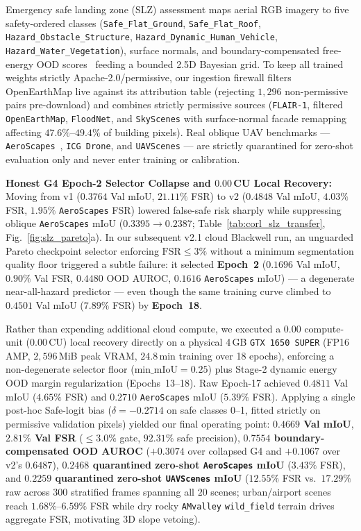 \documentclass[10pt]{article}
\begin{document}
Emergency safe landing zone (SLZ) assessment maps aerial RGB imagery to five safety-ordered classes (\texttt{Safe\_Flat\_Ground}, \texttt{Safe\_Flat\_Roof}, \texttt{Hazard\_Obstacle\_Structure}, \texttt{Hazard\_Dynamic\_Human\_Vehicle}, \texttt{Hazard\_Water\_Vegetation}), surface normals, and boundary-compensated free-energy OOD scores~\cite{liu_energy_ood_2020} feeding a bounded 2.5D Bayesian grid. To keep all trained weights strictly Apache-2.0/permissive, our ingestion firewall filters OpenEarthMap live against its attribution table (rejecting $1{,}296$ non-permissive pairs pre-download) and combines strictly permissive sources (\texttt{FLAIR-1}, filtered \texttt{OpenEarthMap}, \texttt{FloodNet}, and \texttt{SkyScenes} with surface-normal facade remapping affecting $47.6\%$--$49.4\%$ of building pixels). Real oblique UAV benchmarks — \texttt{AeroScapes}~\cite{nigam_aeroscapes_2018}, \texttt{ICG~Drone}, and \texttt{UAVScenes} — are strictly quarantined for zero-shot evaluation only and never enter training or calibration.

\textbf{Honest G4 Epoch-2 Selector Collapse and $0.00$\,CU Local Recovery:} Moving from v1 ($0.3764$ Val mIoU, $21.11\%$ FSR) to v2 ($0.4848$ Val mIoU, $4.03\%$ FSR, $1.95\%$ \texttt{AeroScapes} FSR) lowered false-safe risk sharply while suppressing oblique \texttt{AeroScapes} mIoU ($0.3395 \to 0.2387$; Table~\ref{tab:corl_slz_transfer}, Fig.~\ref{fig:slz_pareto}a). In our subsequent v2.1 cloud Blackwell run, an unguarded Pareto checkpoint selector enforcing $\mathrm{FSR}\le 3\%$ without a minimum segmentation quality floor triggered a subtle failure: it selected \textbf{Epoch~2} ($0.1696$ Val mIoU, $0.90\%$ Val FSR, $0.4480$ OOD AUROC, $0.1616$ \texttt{AeroScapes} mIoU) — a degenerate near-all-hazard predictor — even though the same training curve climbed to $0.4501$ Val mIoU ($7.89\%$ FSR) by \textbf{Epoch~18}.

Rather than expending additional cloud compute, we executed a $0.00$ compute-unit ($0.00$\,CU) local recovery directly on a physical 4\,GB \texttt{GTX~1650~SUPER} (FP16 AMP, $2{,}596$\,MiB peak VRAM, $24.8$\,min training over 18 epochs), enforcing a non-degenerate selector floor ($\mathrm{min\_mIoU}=0.25$) plus Stage-2 dynamic energy OOD margin regularization (Epochs~13--18). Raw Epoch-17 achieved $0.4811$ Val mIoU ($4.65\%$ FSR) and $0.2710$ \texttt{AeroScapes} mIoU ($5.39\%$ FSR). Applying a single post-hoc Safe-logit bias ($\delta=-0.2714$ on safe classes 0--1, fitted strictly on permissive validation pixels) yielded our final operating point: \textbf{$0.4669$ Val mIoU}, \textbf{$2.81\%$ Val FSR} ($\le 3.0\%$ gate, $92.31\%$ safe precision), \textbf{$0.7554$ boundary-compensated OOD AUROC} ($+0.3074$ over collapsed G4 and $+0.1067$ over v2's $0.6487$), \textbf{$0.2468$ quarantined zero-shot \texttt{AeroScapes} mIoU} ($3.43\%$ FSR), and \textbf{$0.2259$ quarantined zero-shot \texttt{UAVScenes} mIoU} ($12.55\%$ FSR vs.\ $17.29\%$ raw across $300$ stratified frames spanning all $20$ scenes; urban/airport scenes reach $1.68\%$--$6.59\%$ FSR while dry rocky \texttt{AMvalley} \texttt{wild\_field} terrain drives aggregate FSR, motivating 3D slope vetoing).
\end{document}
